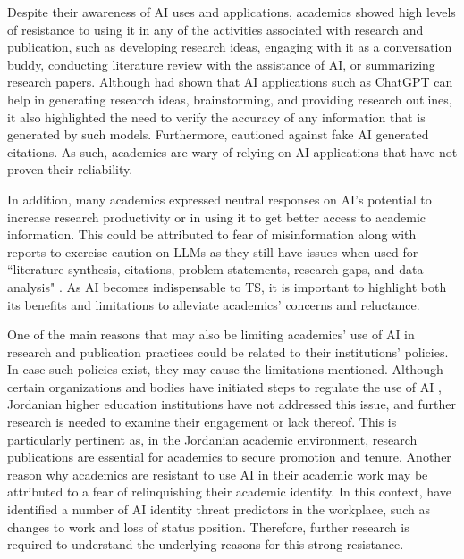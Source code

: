 \documentclass[english]{textolivre}
\begin{document}
Despite their awareness of AI uses and applications, academics showed high levels of resistance to using it in any of the activities associated with research and publication, such as developing research ideas, engaging with it as a conversation buddy, conducting literature review with the assistance of AI, or summarizing research papers. Although \textcite{rahman2023} had shown that AI applications such as ChatGPT can help in generating research ideas, brainstorming, and providing research outlines, it also highlighted the need to verify the accuracy of any information that is generated by such models. Furthermore, \textcite{day2023} cautioned against fake AI generated citations. As such, academics are wary of relying on AI applications that have not proven their reliability.

In addition, many academics expressed neutral responses on AI’s potential to increase research productivity or in using it to get better access to academic information. This could be attributed to fear of misinformation \cite{baidoo-anu2023, sahari2024, shi2025} along with reports to exercise caution on LLMs as they still have issues when used for ``literature synthesis, citations, problem statements, research gaps, and data analysis" \cite[p. 1]{rahman2023}. As AI becomes indispensable to TS, it is important to highlight both its benefits and limitations to alleviate academics’ concerns and reluctance.

One of the main reasons that may also be limiting academics’ use of AI in research and publication practices could be related to their institutions’ policies. In case such policies exist, they may cause the limitations mentioned. Although certain organizations and bodies have initiated steps to regulate the use of AI \cite{europeanparliament2023}, Jordanian higher education institutions have not addressed this issue, and further research is needed to examine their engagement or lack thereof. This is particularly pertinent as, in the Jordanian academic environment, research publications are essential for academics to secure promotion and tenure. Another reason why academics are resistant to use AI in their academic work may be attributed to a fear of relinquishing their academic identity. In this context, \textcite{mirbabaie2022} have identified a number of AI identity threat predictors in the workplace, such as changes to work and loss of status position. Therefore, further research is required to understand the underlying reasons for this strong resistance.
\end{document}
